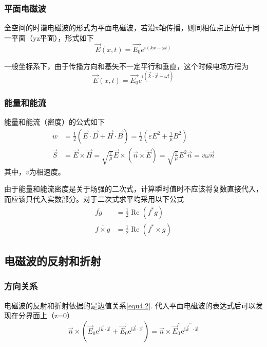 \documentclass[UTF8]{ctexart}
\begin{document}
    \subsubsection{平面电磁波}
    全空间的时谐电磁波的形式为平面电磁波，若沿x轴传播，则同相位点正好位于同一平面（yz平面），形式如下
    \begin{equation}
        \vec{E}(x,t) = \vec{E_0} e^{i(kx-\omega t)}
    \end{equation}

\noindent 一般坐标系下，由于传播方向和基矢不一定平行和垂直，这个时候电场方程为
\begin{equation}
    \vec{E}(x,t) = \vec{E_0} e^{i(\vec{k} \cdot \vec{x}-\omega t)}
\end{equation}

    \subsubsection{能量和能流}
    能量和能流（密度）的公式如下
    \begin{equation}
        \begin{aligned}
            w &= \frac{1}{2}(\vec{E} \cdot \vec{D} + \vec{H} \cdot \vec{B}) = \frac{1}{2} (\varepsilon E^2 + \frac{1}{\mu} B^2) \\
            \vec{S} &= \vec{E} \times \vec{H} = \sqrt{\frac{\varepsilon}{\mu}} \vec{E} \times (\vec{n} \times \vec{E}) = \sqrt{\frac{\varepsilon}{\mu}} E^2 \vec{n} = v \omega \vec{n}
        \end{aligned}
    \end{equation}
\noindent 其中，$v$为相速度。

    由于能量和能流密度是关于场强的二次式，计算瞬时值时不应该将复数直接代入，而应该只代入实数部分。对于二次式求平均采用以下公式
    \begin{equation}
        \begin{aligned}
            \overline{fg} &= \frac{1}{2} \operatorname{Re}(f^{*} g) \\
            \overline{f \times g} &= \frac{1}{2} \operatorname{Re}(f^{*} \times g)
        \end{aligned}
    \end{equation}

    \subsection{电磁波的反射和折射}
    \subsubsection{方向关系}
    电磁波的反射和折射依据的是边值关系\autoref{equ4.2}. 代入平面电磁波的表达式后可以发现在分界面上（z=0）
    \begin{equation}
        \vec{n} \times\left(\vec{E}_{0} \mathrm{e}^{\mathrm{i} \vec{k} \cdot \vec{x}}+\vec{E}_{0}^{\prime} \mathrm{e}^{\mathrm{i} \vec{k} \cdot \vec{x}}\right)=\vec{n} \times \vec{E}_{0}^{\prime \prime} \mathrm{e}^{\mathrm{i} \vec{k}^{\prime \prime} \cdot \vec{x}}
    \end{equation}
\end{document}

